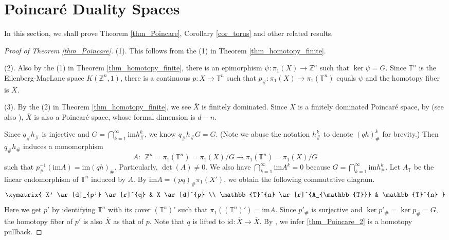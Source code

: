 \documentclass[12pt]{amsart}
\theoremstyle{plain}
\theoremstyle{definition}
\theoremstyle{question}
\theoremstyle{remark}
\theoremstyle{assumption}
\numberwithin{equation}{section}
\theoremstyle{bigthm}
\begin{document}
\section{Poincar\'{e} Duality Spaces}\label{sec_Poincare}
In this section, we shall prove Theorem \ref{thm_Poincare}, Corollary \ref{cor_torus} and other related results.

\begin{proof}[Proof of Theorem \ref{thm_Poincare}]
(1). This follows from the (1) in Theorem \ref{thm_homotopy_finite}.

(2). Also by the (1) in Theorem \ref{thm_homotopy_finite}, there is an epimorphism $\psi \colon  \pi_{1} (X) \rightarrow \mathbb{Z}^{n}$ such that $\ker \psi = G$. Since $\mathbb{T}^{n}$ is the Eilenberg-MacLane space $K(\mathbb{Z}^{n}, 1)$, there is a continuous $p \colon  X \rightarrow \mathbb{T}^{n}$ such that $p_{\#} \colon  \pi_{1} (X) \rightarrow \pi_{1} (\mathbb{T}^{n})$ equals $\psi$ and the homotopy fiber is $\overline{X}$.

(3). By the (2) in Theorem \ref{thm_homotopy_finite}, we see $\overline{X}$ is finitely dominated. Since $X$ is a finitely dominated Poincar\'{e} space, by \cite{Gottlieb} (see also \cite[Theorem~G]{Klein_Qin_Su}), $\overline{X}$ is also a Poincar\' e space, whose formal dimension is $d-n$.

Since $q_{\#} h_{\#}$ is injective and $G = \bigcap_{k=1}^{\infty} \mathrm{im} h_{\#}^{k}$, we know $q_{\#} h_{\#} G = G$. (Note we abuse the notation $h_{\#}^{k}$ to denote $(qh)_{\#}^{k}$ for brevity.) Then $q_{\#} h_{\#}$ induces a monomorphism
\[
A \colon \ \ \mathbb{Z}^{n} = \pi_{1} (\mathbb{T}^{n}) = \pi_{1} (X)/ G \longrightarrow \pi_{1} (\mathbb{T}^{n}) = \pi_{1} (X)/ G
\]
such that $p_{\#}^{-1} (\mathrm{im} A) =  \mathrm{im} (qh)_{\#}$. Particularly, $\det (A) \ne 0$. We also have $\bigcap_{k=1}^{\infty} \mathrm{im} A^{k} =0$ because $G = \bigcap_{k=1}^{\infty} \mathrm{im} h_{\#}^{k}$. Let $A_{\mathbb{T}}$ be the linear endomorphism of $\mathbb{T}^{n}$ induced by $A$. By $\mathrm{im} A = (pq)_{\#} \pi_{1} (X')$, we obtain the following commutative diagram.
\begin{equation}\label{thm_Poincare_2}
\xymatrix{
  X' \ar[d]_{p'} \ar[r]^{q} & X \ar[d]^{p} \\
  \mathbb{T}^{n} \ar[r]^{A_{\mathbb{T}}} & \mathbb{T}^{n}   }
\end{equation}
Here we get $p'$ by identifying $\mathbb{T}^{n}$ with its cover $(\mathbb{T}^{n})'$ such that $\pi_{1} ((\mathbb{T}^{n})') = \mathrm{im} A$. Since $p'_{\#}$ is surjective and $\ker p'_{\#} = \ker p_{\#} = G$, the homotopy fiber of $p'$ is also $\overline{X}$ as that of $p$. Note that $q$ is lifted to $\mathrm{id} \colon  \overline{X} \rightarrow \overline{X}$. By \cite[Proposition~7.6.1]{Selick}, we infer \eqref{thm_Poincare_2} is a homotopy pullback.


\end{proof}
\end{document}
